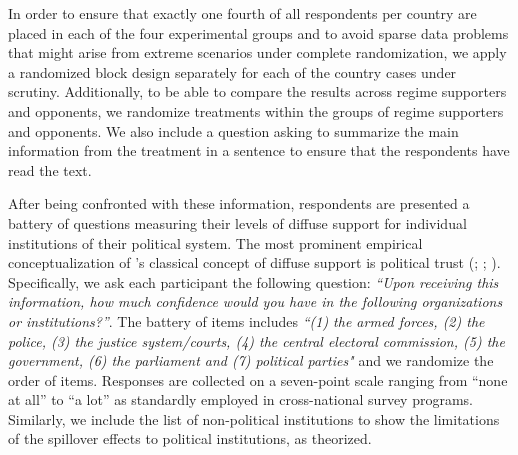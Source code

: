 \documentclass[11pt, ngerman,english,a4]{article}
\begin{document}
In order to ensure that exactly one fourth of all respondents per country are placed in each of the four experimental groups and to avoid sparse data problems that might arise from extreme scenarios under complete randomization, we apply a randomized block design separately for each of the country cases under scrutiny. 
Additionally, to be able to compare the results across regime supporters and opponents, we randomize treatments within the groups of regime supporters and opponents. 
We also include a question asking to summarize the main information from the treatment in a sentence to ensure that the respondents have read the text.     

After being confronted with these information, respondents are presented a battery of questions measuring their levels of diffuse support for individual institutions of their political system. The most prominent empirical conceptualization of \citet{Easton1975}'s classical concept of diffuse support  is political trust (\citealt{Hooghe2012}; \citealt{Schneider2017}; \citealt{Frye2019}). Specifically, we ask each participant the following question: \textit{“Upon receiving this information, how much confidence would you have in the following organizations or institutions?”}. The battery of items includes \textit{“(1) the armed forces, (2) the police, (3) the justice system/courts, (4) the central electoral commission, (5) the government, (6) the parliament and (7) political parties"} and we randomize the order of items. Responses are collected on a seven-point scale ranging from “none at all” to “a lot” as standardly employed in cross-national survey programs. Similarly, we include the list of non-political institutions to show the limitations of the spillover effects to political institutions, as theorized. 
\end{document}

